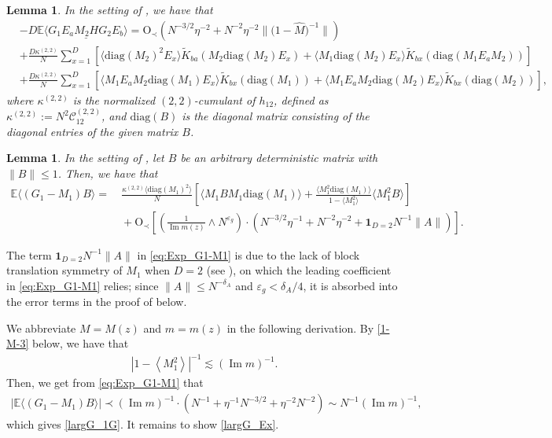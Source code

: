 \documentclass[10pt,reqno]{amsart}
\numberwithin{equation}{section}
\numberwithin{figure}{section}
\theoremstyle{plain} %
\newtheorem{lemma}[theorem]{Lemma}
\theoremstyle{definition} %
\newcommand{\cal}{\mathcal}
\newcommand{\wh}{\widehat}
\newcommand{\wt}{\widetilde}
\newcommand{\E}{\mathbb{E}}
\newcommand{\pa}[1]{\left({#1}\right)}
\newcommand{\qa}[1]{\left[{#1}\right]}
\newcommand{\absa}[1]{\left\lvert #1 \right\rvert}
\newcommand{\avga}[1]{\left\langle #1 \right\rangle}
\newcommand{\diag}{\mathrm{diag}}
\DeclareMathOperator{\im}{\mathrm{Im}}
\newcommand{\be}{\begin{equation}}
\newcommand{\ee}{\end{equation}}
\newcommand{\e}{{\varepsilon}}
\newcommand{\OO}{\mathrm{O}}
\newcommand{\opr}[1]{\mathrm{O}_\prec\left({#1}\right)}
\numberwithin{equation}{section}
\begin{document}
\begin{lemma}\label{lem:fourthcumu1}
In the setting of , we have that     
 \begin{align}
&- D\E\langle \underline{G_1E_aM_2HG_2E_b}\rangle=\opr{N^{-3/2}\eta^{-2} +N^{-2}\eta^{-2}\big\|\big({1-\wh M}\big)^{-1}\big\|} \nonumber\\ &+\frac{D\kappa^{(2, 2)}}{N}\sum_{x=1}^D \left[  { \langle \diag(M_2)^2E_x\rangle }\wt K_{ba}(M_2\diag(M_2)E_x) +\langle M_1 \diag(M_2)E_x\rangle  \wt K_{bx}(\diag(M_1E_aM_2))\right]\nonumber\\
&+\frac{D\kappa^{(2, 2)}}{N}\sum_{x=1}^D   \left[\langle M_1E_aM_2 \diag(M_1)E_x\rangle  \wt K_{bx}(\diag(M_1))+\langle M_1E_aM_2 \diag(M_2)E_x\rangle  \wt K_{bx}(\diag(M_2))\right]  ,\label{eq:G1HG2}
    \end{align}
where $\kappa^{(2, 2)}$ is the normalized $(2,2)$-cumulant of $h_{12}$, defined as $\kappa^{(2, 2)}:=N^2\cal C_{12}^{(2,2)}$, and $\diag(B)$ is the diagonal matrix consisting of the diagonal entries of the given matrix $B$.  
\end{lemma}

\begin{lemma}\label{lem:fourthcumu2}
In the setting of , let $B$ be an arbitrary deterministic matrix with $\|B\|\le 1$. Then, we have that
    \be\label{eq:Exp_G1-M1}
    \begin{aligned}
    \E \langle(G_1 - M_1)B\rangle 
    =&~\frac{\kappa^{(2,2)}  \langle \diag(M_1)^2 \rangle }{N}\left[ \langle M_1BM_1\diag(M_1)\rangle   +   \frac{ \langle M_1^2 \diag(M_1)\rangle}{1-\langle M_1^2\rangle } \langle M_1^2B\rangle\right]\\
    &~ + \OO_\prec\qa{\pa{\frac{1}{\im m (z) }\wedge N^{\varepsilon_g}}\cdot{\pa{ N^{-3/2}\eta^{-1}+N^{-2}\eta^{-2}+\mathbf 1_{D=2}N^{-1}\|A\|}}}.
    \end{aligned}
    \ee
\end{lemma}
The term $\mathbf 1_{D=2}N^{-1}\|A\|$ in \eqref{eq:Exp_G1-M1} is due to the lack of block translation symmetry of $M_1$ when $D=2$ (see ), on which the leading coefficient in \eqref{eq:Exp_G1-M1} relies; since $\|A\|\le N^{-\delta_A}$ and $\e_g<\delta_A/4$, it is absorbed into the error terms in the proof of  below.

We abbreviate $M=M (z) $ and $m=m (z) $ in the following derivation. By \eqref{1-M-3} below, we have that
\begin{equation}\nonumber
    \begin{aligned}
        \absa{1-\avga{M_1^2}}^{-1}\lesssim \pa{\im m}^{-1}.
    \end{aligned}
\end{equation}
Then, we get from \eqref{eq:Exp_G1-M1} that
\begin{equation}\label{proof_largG_1G}
    \begin{aligned}
        \absa{\E \langle(G_1 - M_1)B\rangle }\prec \pa{\im m}^{-1}\cdot  \pa{N^{-1}+\eta^{-1}N^{-3/2}+\eta^{-2}N^{-2}}\sim N^{-1}\pa{\im m}^{-1},
    \end{aligned}
\end{equation}
which gives \eqref{largG_1G}. It remains to show \eqref{largG_Ex}.
\end{document}
